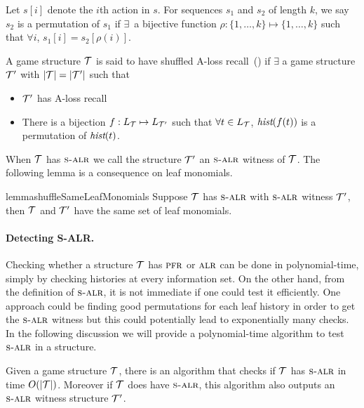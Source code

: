 Let $s[i]$ denote the $i$th action in $s$. For sequences $s_1$ and $s_2$ of length $k$, we say
$s_2$ is a permutation of $s_1$ if $\exists$~a bijective function
$\rho : \{1,\dots,k\} \mapsto \{1,\dots,k\}$ such that $\forall i$,
$s_1[i] = s_2[\rho(i)]$.


\begin{definition}\label{def:salr}
  A game structure $\mathcal{T}$ is said to have shuffled A-loss
  recall~(\salr) if $\exists$ a game structure $\mathcal{T}'$ with
  $|\mathcal{T}| = |\mathcal{T}'|$ such that
  \begin{itemize}   \item $\mathcal{T}'$ has A-loss recall
  \item There is a bijection $f : L_{\mathcal{T}} \mapsto L_{\mathcal{T}'}$ such that
    $\forall t \in L_{\mathcal{T}}$, $\textit{hist}(f(t))$ is a permutation of
    $\textit{hist}(t)$.
  \end{itemize}
\end{definition}
When $\mathcal{T}$ has $\textsc{s-alr}$ we call the structure $\mathcal{T}'$ an $\textsc{s-alr}$ witness of $\mathcal{T}$. The following lemma is a consequence on leaf monomials.

\begin{restatable}{lemma}{shuffleSameLeafMonomials}\label{lem:alr-salr-same-leaf-monomials}
  Suppose $\mathcal{T}$ has $\textsc{s-alr}$ with $\textsc{s-alr}$ witness $\mathcal{T}'$, then $\mathcal{T}$ and $\mathcal{T}'$ have the same set of leaf
  monomials.
\end{restatable}


\paragraph*{Detecting S-ALR.}

Checking whether a structure $\mathcal{T}$ has $\textsc{pfr}$ or $\textsc{alr}$ can be done in
polynomial-time, simply by checking histories at every information
set. On the other hand, from the definition of $\textsc{s-alr}$, it is not
immediate if one could test it efficiently. One approach could be
finding good permutations for each leaf history in order to get the $\textsc{s-alr}$ witness but this could potentially lead to
exponentially many checks.  In the following discussion we will
provide a polynomial-time algorithm to test $\textsc{s-alr}$ in a structure.

\begin{theorem}\label{thm:shuffle-detection-ptime} Given a game structure
  $\mathcal{T}$, there is an algorithm that checks if $\mathcal{T}$ has $\textsc{s-alr}$ in
  time $O(|\mathcal{T}|)$. Moreover if $\mathcal{T}$ does have $\textsc{s-alr}$, this algorithm
  also outputs an $\textsc{s-alr}$ witness structure $\mathcal{T}'$.
\end{theorem}

